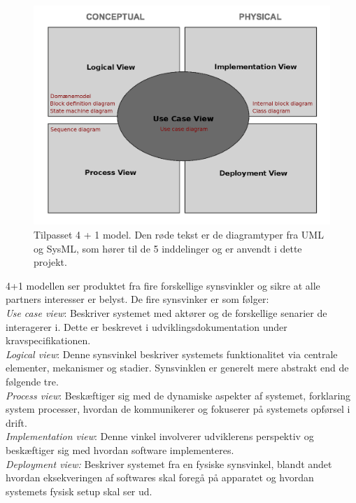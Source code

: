 	\begin{figure}[H]
		\includegraphics[width = \textwidth]{billeder/4plus1model.png}
		\caption{Tilpasset 4 + 1 model. Den røde tekst er de diagramtyper fra UML og SysML, som hører til de 5 inddelinger og er anvendt i dette projekt.}\label{fig:4plus1model}
	\end{figure}
	
	4+1 modellen ser produktet fra fire forskellige synsvinkler og sikre at alle partners interesser er belyst. De fire synsvinker er som følger: 
	\\ \textit{Use case view}: Beskriver systemet med aktører og de forskellige senarier de interagerer i. Dette er beskrevet i udviklingsdokumentation under kravspecifikationen.\\
	\textit{Logical view}: Denne synsvinkel beskriver systemets funktionalitet via centrale elementer, mekanismer og stadier. Synsvinklen er generelt mere abstrakt end de følgende tre. \\
	\textit{Process view}: Beskæftiger sig med de dynamiske aspekter af systemet, forklaring system processer, hvordan de kommunikerer og fokuserer på systemets opførsel i drift. \\
	\textit{Implementation view}: Denne vinkel involverer udviklerens perspektiv og beskæftiger sig med hvordan software implementeres. \\
	\textit{Deployment view:} Beskriver systemet fra en fysiske synsvinkel, blandt andet hvordan eksekveringen af softwares skal foregå på apparatet og hvordan systemets fysisk setup skal ser ud. 
	
